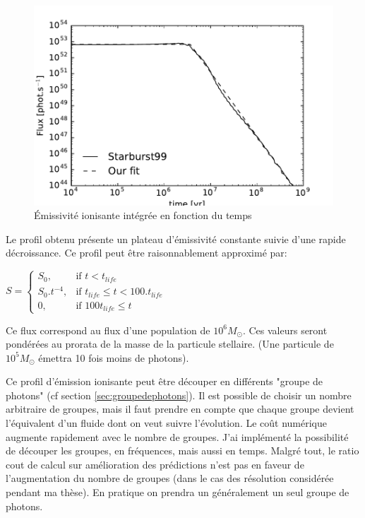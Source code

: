 \begin{figure}[htbp]
        \includegraphics[width=.95\linewidth]{img/03/flux.pdf} 
        \caption{Émissivité ionisante intégrée en fonction du temps}
 		\label{fig:flux}
\end{figure}

Le profil obtenu présente un plateau d'émissivité constante suivie d'une rapide décroissance.
Ce profil peut être raisonnablement approximé par:

$
    S = 
\begin{cases}
    S_0 ,         & \text{if } t < t_{life}\\
    S_0.t^{-4},   & \text{if } t_{life} \leq t < 100.t_{life} \\
    0,   & \text{if } 100t_{life} \leq t
\end{cases}
$

Ce flux correspond au flux d'une population de $10^6M_\odot$.
Ces valeurs seront pondérées au prorata de la masse de la particule stellaire. (Une particule de $10^5M_\odot$ émettra 10 fois moins de photons).

Ce profil d’émission ionisante peut être découper en différents "groupe de photons" (cf section \ref{sec:groupedephotons}).
Il est possible de choisir un nombre arbitraire de groupes, mais il faut prendre en compte que chaque groupe devient l'équivalent d'un fluide dont on veut suivre l'évolution.
Le coût numérique augmente rapidement avec le nombre de groupes. 
J'ai implémenté la possibilité de découper les groupes, en fréquences, mais aussi en temps.
Malgré tout, le ratio cout de calcul sur amélioration des prédictions n'est pas en faveur de l'augmentation du nombre de groupes (dans le cas des résolution considérée pendant ma thèse).
En pratique on prendra un généralement un seul groupe de photons.

